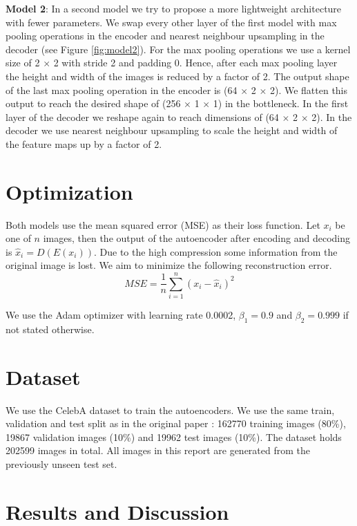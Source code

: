 \documentclass{article}
\begin{document}
\begin{multicols}{2}
\textbf{Model 2}: In a second model we try to propose a more lightweight architecture with fewer parameters. We swap every other layer of the first model with max pooling operations in the encoder and nearest neighbour upsampling in the decoder (see Figure \ref{fig:model2}). For the max pooling operations we use a kernel size of 2 $\times$ 2 with stride 2 and padding 0. Hence, after each max pooling layer the height and width of the images is reduced by a factor of 2. The output shape of the last max pooling operation in the encoder is (64 $\times$ 2 $\times$ 2). We flatten this output to reach the desired shape of (256 $\times$ 1 $\times$ 1) in the bottleneck. In the first layer of the decoder we reshape again to reach dimensions of (64 $\times$ 2 $\times$ 2). In the decoder we use nearest neighbour upsampling to scale the height and width of the feature maps up by a factor of 2.

\section{Optimization}
Both models use the mean squared error (MSE) as their loss function. Let $x_i$ be one of $n$ images, then the output of the autoencoder after encoding and decoding is $\hat{x}_i = D(E(x_i))$. Due to the high compression some information from the original image is lost. We aim to minimize the following reconstruction error.
\begin{equation}
	MSE = \frac{1}{n} \sum_{i=1}^n (x_i - \hat{x}_i)^2
\end{equation}

We use the Adam optimizer with learning rate 0.0002, $\beta_1 = 0.9$ and $\beta_2 = 0.999$ if not stated otherwise. 

\section{Dataset}

We use the CelebA dataset to train the autoencoders. We use the same train, validation and test split as in the original paper \cite{liu2015faceattributes}: 162770 training images (80\%), 19867 validation images (10\%) and 19962 test images (10\%). The dataset holds 202599 images in total. All images in this report are generated from the previously unseen test set.

\section{Results and Discussion}


\end{multicols}
\end{document}
